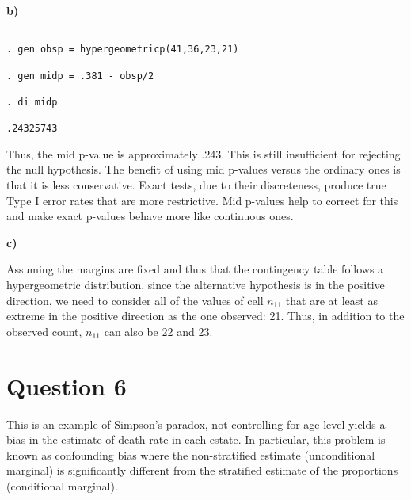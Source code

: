 \documentclass{article}
\begin{document}
\textbf{b)}

\begin{verbatim}
    
. gen obsp = hypergeometricp(41,36,23,21)

. gen midp = .381 - obsp/2

. di midp

.24325743
\end{verbatim}

Thus, the mid p-value is approximately .243. This is still insufficient for rejecting the null hypothesis. The benefit of using mid p-values versus the ordinary ones is that it is less conservative. Exact tests, due to their discreteness, produce true Type I error rates that are more restrictive. Mid p-values help to correct for this and make exact p-values behave more like continuous ones.

\textbf{c)}

Assuming the margins are fixed and thus that the contingency table follows a hypergeometric distribution, since the alternative hypothesis is in the positive direction, we need to consider all of the values of cell $n_{11}$ that are at least as extreme in the positive direction as the one observed: 21. Thus, in addition to the observed count, $n_{11}$ can also be 22 and 23.  

\section*{Question 6}

This is an example of Simpson's paradox, not controlling for age level yields a bias in the estimate of death rate in each estate. In particular, this problem is known as confounding bias where the non-stratified estimate (unconditional marginal) is significantly different from the stratified estimate of the proportions (conditional marginal).
\end{document}
